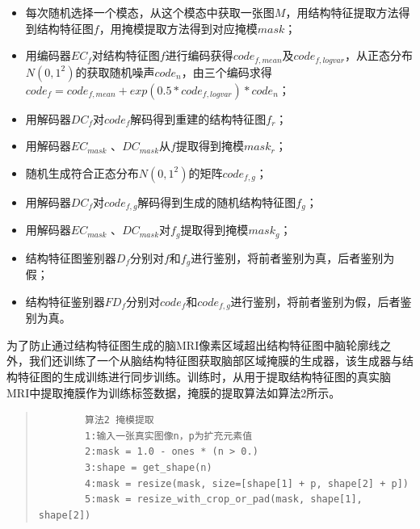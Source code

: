 \documentclass[letterpaper]{article} %
\begin{document}
\begin{itemize}
	\item 每次随机选择一个模态，从这个模态中获取一张图$M$，用结构特征提取方法得到结构特征图$f$，用掩模提取方法得到对应掩模$mask$；
	\item 用编码器$EC_f$对结构特征图$f$进行编码获得$code_{f,mean}$及$code_{f,logvar}$，从正态分布$N(0,1^2)$的获取随机噪声$code_n$，由三个编码求得$code_f=code_{f,mean}+exp(0.5*code_{f,logvar})*code_n$；
	\item 用解码器$DC_f$对$code_f$解码得到重建的结构特征图$f_r$；
	\item 用解码器$EC_{mask}$ 、$DC_{mask}$从$f$提取得到掩模$mask_r$；
	\item 随机生成符合正态分布$N(0,1^2)$的矩阵$code_{f,g}$；
	\item 用解码器$DC_f$对$code_{f,g}$解码得到生成的随机结构特征图$f_g$；
	\item 用解码器$EC_{mask}$ 、$DC_{mask}$对$f_g$提取得到掩模$mask_g$；
	\item 结构特征图鉴别器$D_f$分别对$f$和$f_g$进行鉴别，将前者鉴别为真，后者鉴别为假；
	\item 结构特征鉴别器$FD_f$分别对$code_f$和$code_{f,g}$进行鉴别，将前者鉴别为假，后者鉴别为真。
\end{itemize}

为了防止通过结构特征图生成的脑MRI像素区域超出结构特征图中脑轮廓线之外，我们还训练了一个从脑结构特征图获取脑部区域掩膜的生成器，该生成器与结构特征图的生成训练进行同步训练。训练时，从用于提取结构特征图的真实脑MRI中提取掩膜作为训练标签数据，掩膜的提取算法如算法2所示。
\begin{quote}
	\begin{scriptsize}\begin{verbatim}
		算法2 掩模提取
		1:输入一张真实图像n，p为扩充元素值
		2:mask = 1.0 - ones * (n > 0.)
		3:shape = get_shape(n)
		4:mask = resize(mask, size=[shape[1] + p, shape[2] + p])
		5:mask = resize_with_crop_or_pad(mask, shape[1], shape[2])
		\end{verbatim}\end{scriptsize}
\end{quote}
\end{document}
